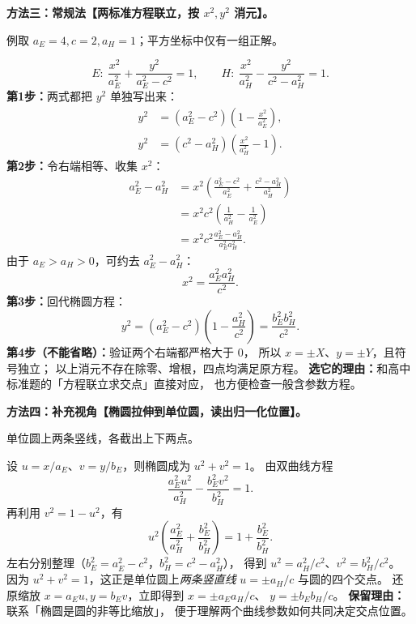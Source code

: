 \clearpage
\begin{proofbox}
\textbf{方法三：常规法【两标准方程联立，按 $x^2,y^2$ 消元】。}

\begin{center}


{\small 例取 $a_E=4,c=2,a_H=1$；平方坐标中仅有一组正解。}
\end{center}


\[
E:\ \frac{x^2}{a_E^2}+\frac{y^2}{a_E^2-c^2}=1,
\qquad
H:\ \frac{x^2}{a_H^2}-\frac{y^2}{c^2-a_H^2}=1.
\]
\textbf{第1步：}两式都把 $y^2$ 单独写出来：
\[
\begin{aligned}
y^2&=(a_E^2-c^2)\left(1-\frac{x^2}{a_E^2}\right),\\
y^2&=(c^2-a_H^2)\left(\frac{x^2}{a_H^2}-1\right).
\end{aligned}
\]
\textbf{第2步：}令右端相等、收集 $x^2$：
\[
\begin{aligned}
a_E^2-a_H^2
&=x^2\left(\frac{a_E^2-c^2}{a_E^2}
+\frac{c^2-a_H^2}{a_H^2}\right)\\
&=x^2c^2\left(\frac1{a_H^2}-\frac1{a_E^2}\right)\\
&=x^2c^2\frac{a_E^2-a_H^2}{a_E^2a_H^2}.
\end{aligned}
\]
由于 $a_E>a_H>0$，可约去 $a_E^2-a_H^2$：
\[
\boxed{x^2=\frac{a_E^2a_H^2}{c^2}}.
\]
\textbf{第3步：}回代椭圆方程：
\[
\boxed{y^2=(a_E^2-c^2)\left(1-\frac{a_H^2}{c^2}\right)
=\frac{b_E^2b_H^2}{c^2}}.
\]
\textbf{第4步（不能省略）：}验证两个右端都严格大于 $0$，
所以 $x=\pm X$、$y=\pm Y$，且符号独立；
以上消元不存在除零、增根，四点均满足原方程。
\textbf{选它的理由：}和高中标准题的「方程联立求交点」直接对应，
也方便检查一般含参数方程。
\end{proofbox}

\clearpage
\begin{proofbox}
\textbf{方法四：补充视角【椭圆拉伸到单位圆，读出归一化位置】。}

\begin{center}


{\small 单位圆上两条竖线，各截出上下两点。}
\end{center}


设 $u=x/a_E$、$v=y/b_E$，则椭圆成为 $u^2+v^2=1$。
由双曲线方程
\[
\frac{a_E^2u^2}{a_H^2}-\frac{b_E^2v^2}{b_H^2}=1.
\]
再利用 $v^2=1-u^2$，有
\[
u^2\left(\frac{a_E^2}{a_H^2}+\frac{b_E^2}{b_H^2}\right)
=1+\frac{b_E^2}{b_H^2}.
\]
左右分别整理（$b_E^2=a_E^2-c^2$，$b_H^2=c^2-a_H^2$），
得到 $u^2=a_H^2/c^2$、$v^2=b_H^2/c^2$。
因为 $u^2+v^2=1$，这正是单位圆上\emph{两条竖直线}
$u=\pm a_H/c$ 与圆的四个交点。
还原缩放 $x=a_Eu,y=b_Ev$，立即得到 $x=\pm a_Ea_H/c$、
$y=\pm b_Eb_H/c$。
\textbf{保留理由：}联系「椭圆是圆的非等比缩放」，
便于理解两个曲线参数如何共同决定交点位置。
\end{proofbox}

